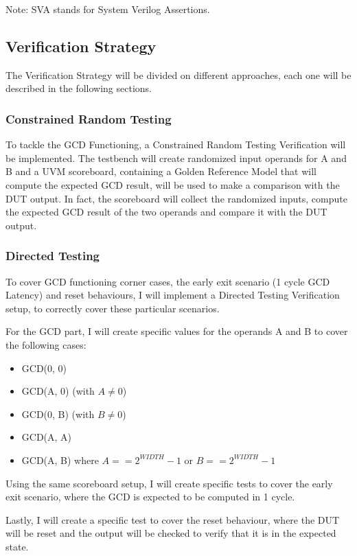 Note: SVA stands for System Verilog Assertions.

\subsection{Verification Strategy}
The Verification Strategy will be divided on different approaches, each one will be described in the following sections.

\subsubsection{Constrained Random Testing}
To tackle the GCD Functioning, a Constrained Random Testing Verification will be implemented. The testbench will create randomized input operands for A and B and a UVM scoreboard, containing a Golden Reference Model that will compute the expected GCD result, will be used to make a comparison with the DUT output. In fact, the scoreboard will collect the randomized inputs, compute the expected GCD result of the two operands and compare it with the DUT output. 

\subsubsection{Directed Testing}
To cover GCD functioning corner cases, the early exit scenario (1 cycle GCD Latency) and reset behaviours, I will implement a Directed Testing Verification setup, to correctly cover these particular scenarios.

For the GCD part, I will create specific values for the operands A and B to cover the following cases: 
\begin{itemize}
    \item GCD(0, 0)
    \item GCD(A, 0) (with $A \neq 0$)
    \item GCD(0, B) (with $B \neq 0$)
    \item GCD(A, A)
    \item GCD(A, B) where $A == 2^{WIDTH} -1$ or $B == 2^{WIDTH} - 1$
\end{itemize}


Using the same scoreboard setup, I will create specific tests to cover the early exit scenario, where the GCD is expected to be computed in 1 cycle.

Lastly, I will create a specific test to cover the reset behaviour, where the DUT will be reset and the output will be checked to verify that it is in the expected state.\\

